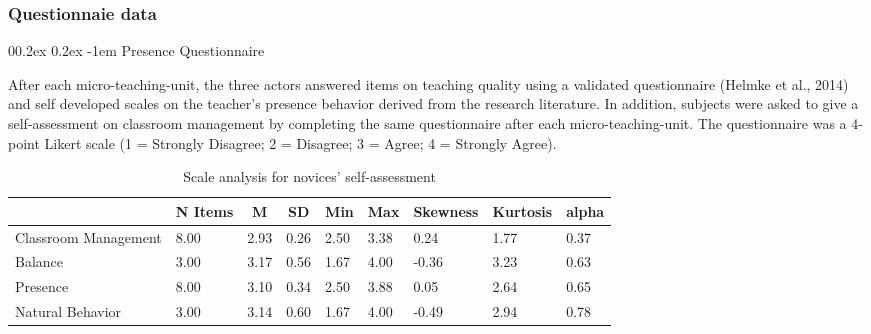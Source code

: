\documentclass[
  man]{apa6}
\makeatletter
\let\oldparagraph\paragraph
\renewcommand{\paragraph}[1]{\oldparagraph{#1}\mbox{}}
\renewcommand{\paragraph}{\@startsection{paragraph}{4}{\parindent}%
  {0\baselineskip \@plus 0.2ex \@minus 0.2ex}%
  {-1em}%
  {\normalfont\normalsize\bfseries\itshape\typesectitle}}
\makeatother
\begin{document}
\hypertarget{questionnaie-data}{%
\subsubsection{Questionnaie data}\label{questionnaie-data}}

\hypertarget{presence-questionnaire}{%
\paragraph{Presence Questionnaire}\label{presence-questionnaire}}

After each micro-teaching-unit, the three actors answered items on teaching quality using a validated questionnaire (Helmke et al., 2014) and self developed scales on the teacher's presence behavior derived from the research literature. In addition, subjects were asked to give a self-assessment on classroom management by completing the same questionnaire after each micro-teaching-unit. The questionnaire was a 4-point Likert scale (1 = Strongly Disagree; 2 = Disagree; 3 = Agree; 4 = Strongly Agree).

\begin{table}[h]

\begin{center}
\begin{threeparttable}

\caption{\label{tab:presence_questionnaire}Scale analysis for novices' self-assessment}

\tiny{

\begin{tabular}{lllllllll}
\toprule
 & \multicolumn{1}{c}{N Items} & \multicolumn{1}{c}{M} & \multicolumn{1}{c}{SD} & \multicolumn{1}{c}{Min} & \multicolumn{1}{c}{Max} & \multicolumn{1}{c}{Skewness} & \multicolumn{1}{c}{Kurtosis} & \multicolumn{1}{c}{alpha}\\
\midrule
Classroom Management & 8.00 & 2.93 & 0.26 & 2.50 & 3.38 & 0.24 & 1.77 & 0.37\\
Balance & 3.00 & 3.17 & 0.56 & 1.67 & 4.00 & -0.36 & 3.23 & 0.63\\
Presence & 8.00 & 3.10 & 0.34 & 2.50 & 3.88 & 0.05 & 2.64 & 0.65\\
Natural Behavior & 3.00 & 3.14 & 0.60 & 1.67 & 4.00 & -0.49 & 2.94 & 0.78\\
\bottomrule
\end{tabular}

}

\end{threeparttable}
\end{center}

\end{table}
\end{document}
